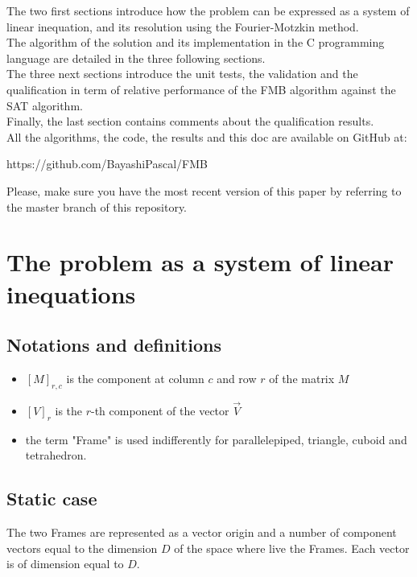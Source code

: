 \documentclass[12pt, a4paper]{article}
\begin{document}
The two first sections introduce how the problem can be expressed as a system of linear inequation, and its resolution using the Fourier-Motzkin method.\\

The algorithm of the solution and its implementation in the C programming language are detailed in the three following sections.\\

The three next sections introduce the unit tests, the validation and the qualification in term of relative performance of the FMB algorithm against the SAT algorithm.\\

Finally, the last section contains comments about the qualification results.\\

All the algorithms, the code, the results and this doc are available on GitHub at:
\begin{center}
https://github.com/BayashiPascal/FMB
 \end{center}
Please, make sure you have the most recent version of this paper by referring to the master branch of this repository.
 
\section{The problem as a system of linear inequations}

\subsection{Notations and definitions}

\begin{itemize}
\item{$\left[M\right]_{r,c}$ is the component at column $c$ and row $r$ of the matrix $M$}
\item{$\left[V\right]_r$ is the $r$-th component of the vector $\overrightarrow{V}$}
\item the term "Frame" is used indifferently for parallelepiped, triangle, cuboid and tetrahedron.
\end{itemize}

\subsection{Static case}

The two Frames are represented as a vector origin and a number of component vectors equal to the dimension $D$ of the space where live the Frames. Each vector is of dimension equal to $D$.\\
\end{document}
